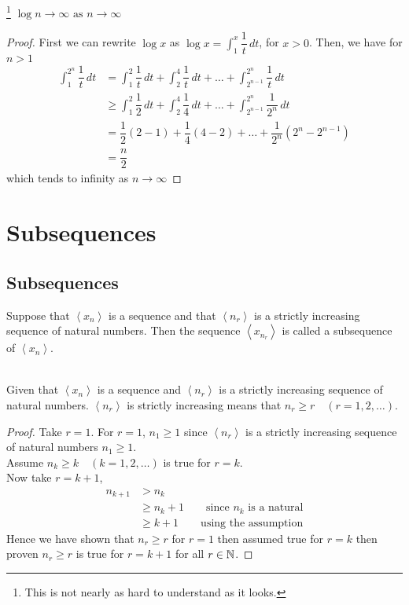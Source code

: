 \documentclass[10pt, a4paper]{article}
\newcommand{\limas}[3][n]{#2 \rightarrow #3 \text{ as } #1 \rightarrow \infty}
\newcommand{\seq}[1][x_n]{\left\langle #1 \right\rangle}
\begin{document}
\begin{theorem}\label{thm_logdiverge}\footnote{This is not nearly as hard to understand as it looks.}
    $\limas{\log{n}}{\infty}$
    \begin{proof}
        First we can rewrite $\log{x}$ as $\displaystyle\log{x} = \int_{1}^{x}{\dfrac{1}{t}}\,dt$, for $x > 0$. Then, we have for $n > 1$
        \begin{align*}
            \int_{1}^{2 ^ n}{\dfrac{1}{t}}\,dt &= \int_{1}^{2}{\dfrac{1}{t}}\,dt + \int_{2}^{4}{\dfrac{1}{t}}\,dt + \dots + \int_{2 ^ {n-1}}^{2 ^ n}{\dfrac{1}{t}}\,dt \\
            &\geq \int_{1}^{2}{\dfrac{1}{2}}\,dt + \int_{2}^{4}{\dfrac{1}{4}}\,dt + \dots + \int_{2 ^ {n-1}}^{2 ^ n}{\dfrac{1}{2 ^ n}}\,dt \\
            &= \dfrac{1}{2}(2 - 1) + \dfrac{1}{4}(4 - 2) + \dots + \dfrac{1}{2 ^ n}(2 ^ n - 2 ^ {n - 1}) \\
            &= \dfrac{n}{2}
        \end{align*}
        which tends to infinity as $n \rightarrow \infty$
    \end{proof}
\end{theorem}

\newpage

\section{Subsequences}

\subsection{Subsequences}
Suppose that $\seq$ is a sequence and that $\seq[n_r]$ is a strictly increasing sequence of natural numbers. Then the sequence $\seq[x_{n_r}]$ is called a subsequence of $\seq$. \\
\\
\begin{remark}\label{remark_subseq_nrgeqr}
Given that $\seq$ is a sequence and $\seq[n_r]$ is a strictly increasing sequence of natural numbers. $\seq[n_r]$ is strictly increasing means that $n_r \geq r\quad(r = 1, 2,\dots).$
\begin{proof}
    Take $r = 1$. For $r = 1$, $n_1 \geq 1$ since $\seq[n_r]$ is a strictly increasing sequence of natural numbers $n_1 \geq 1$. \\
    Assume $n_k \geq k\quad(k = 1, 2,\dots)$ is true for $r = k$. \\
    Now take $r = k + 1$,
    \begin{align*}
        n_{k + 1} &> n_k \\
        &\geq n_k + 1\qquad\text{since $n_k$ is a natural} \\
        &\geq k + 1\qquad\text{using the assumption}
    \end{align*}
    Hence we have shown that $n_r \geq r$ for $r = 1$ then assumed true for $r = k$ then proven $n_r \geq r$ is true for $r = k + 1$ for all $r \in \mathbb{N}$.
\end{proof}
\end{remark}
\end{document}
